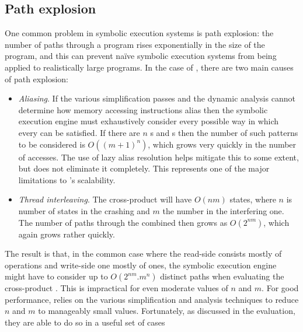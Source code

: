 
\subsection{Path explosion}

One common problem in symbolic execution systems is path explosion:
the number of paths through a program rises exponentially in the size
of the program, and this can prevent na\"ive symbolic execution
systems from being applied to realistically large programs.  In the
case of \technique, there are two main causes of path explosion:
\begin{itemize}
\item
  \textit{Aliasing}.  If the various simplification passes and the
  dynamic analysis cannot determine how memory accessing instructions
  alias then the symbolic execution engine must exhaustively consider
  every possible way in which every  can be satisfied.  If
  there are $n$ s and s then the number of
  such patterns to be considered is $O((m+1)^n)$, which grows very
  quickly in the number of accesses.  The use of lazy alias resolution
  helps mitigate this to some extent, but does not eliminate it
  completely.  This represents one of the major limitations to
  \technique's scalability.
\item
  \textit{Thread interleaving}.  The cross-product {\StateMachine}
  will have $O(nm)$ states, where $n$ is number of states in the
  crashing {\StateMachine} and $m$ the number in the interfering one.
  The number of paths through the combined {\StateMachine} then grows
  as $O(2^{nm})$, which again grows rather quickly.
\end{itemize}
The result is that, in the common case where the read-side
{\StateMachine} consists mostly of  operations and
write-side one mostly of  ones, the symbolic execution
engine might have to consider up to $O(2^{nm}.m^n)$ distinct
paths  when evaluating
the cross-product {\StateMachine}.  This is impractical for even
moderate values of $n$ and $m$.  For good performance, {\technique}
relies on the various simplification and analysis techniques to reduce
$n$ and $m$ to manageably small values.  Fortunately, as discussed in
the evaluation, they are able to do so in a useful set of
cases

